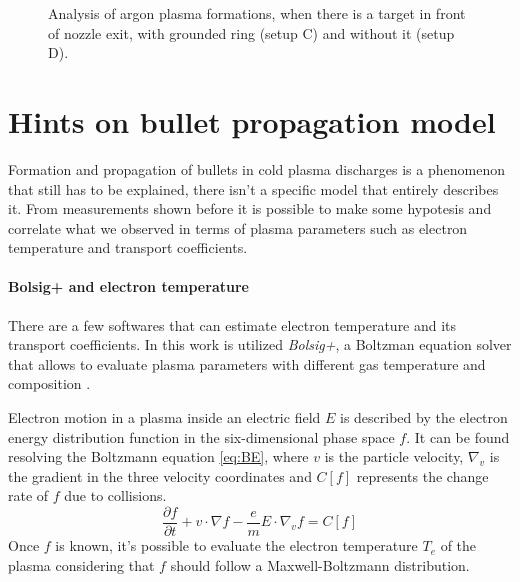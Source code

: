 \begin{figure}
 \hfill
 \caption{Analysis of argon plasma formations, when there is a target in front of nozzle exit, with grounded ring (setup C) and without it (setup D).}
 \label{fig:argon_de}
\end{figure}


\section{Hints on bullet propagation model}
Formation and propagation of bullets in cold plasma discharges is a phenomenon that still has to be explained, there isn't a specific model that entirely describes it.
From measurements shown before it is possible to make some hypotesis and correlate what we observed in terms of plasma parameters such as electron temperature and transport coefficients.

\paragraph{Bolsig+ and electron temperature}
There are a few softwares that can estimate electron temperature and its transport coefficients. In this work is utilized \emph{Bolsig+}, a Boltzman equation solver that allows to evaluate plasma parameters with different gas temperature and composition \cite{Hagelaar_2005}.

Electron motion in a plasma inside an electric field $E$ is described by the electron energy distribution function in the six-dimensional phase space $f$. It can be found resolving the Boltzmann equation \ref{eq:BE}, where $v$ is the particle velocity, $\nabla_{v}$ is the gradient in the three velocity coordinates and $C[f]$ represents the change rate of $f$ due to collisions.
\begin{equation}
\frac{\partial f}{\partial t} + v \cdot \nabla f - \frac{e}{m} E \cdot \nabla_{v} f = C[f]
 \label{eq:BE}
\end{equation}
Once $f$ is known, it's possible to evaluate the electron temperature $T_{e}$ of the plasma considering that $f$ should follow a Maxwell-Boltzmann distribution.

